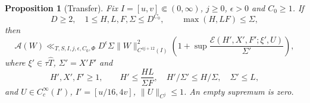 \documentclass[11pt,a4paper]{article}
\numberwithin{equation}{section}
\newtheorem{proposition}[theorem]{Proposition}
\theoremstyle{definition}
\theoremstyle{remark}
\newcommand{\E}{\mathcal E}
\begin{document}
\begin{proposition}[Transfer]\label{prop:transfer}
Fix $I=[u,v]\Subset(0,\infty)$, $j\ge0$, $\epsilon>0$ and $C_0\ge1$. If
\[
 D\ge2,\quad1\le H,L,F,\Sigma\le D^{C_0},\qquad\max(H,LF)\le\Sigma,
\]
then
\begin{equation}\label{eq:transfer}
 \mathcal A(W)\ll_{T,S,I,j,\epsilon,C_0,\Phi}
 D^\epsilon\Sigma\|W\|_{C^{4j+12}(I)}^2
 \left(1+\sup\frac{\E(H',X',F';\xi',U)}{\Sigma'}\right),
\end{equation}
where $\xi'\in\tau\widehat T$, $\Sigma'=X'F'$ and
\begin{equation}\label{eq:children}
 H',X',F'\ge1,\qquad H'\le\frac{HL}{\Sigma F},\quad
 H'/\Sigma'\le H/\Sigma,\quad\Sigma'\le L,
\end{equation}
and $U\in C_c^\infty(I')$, $I'=[u/16,4v]$, $\|U\|_{C^j}\le1$. An empty supremum is zero.
\end{proposition}
\end{document}
